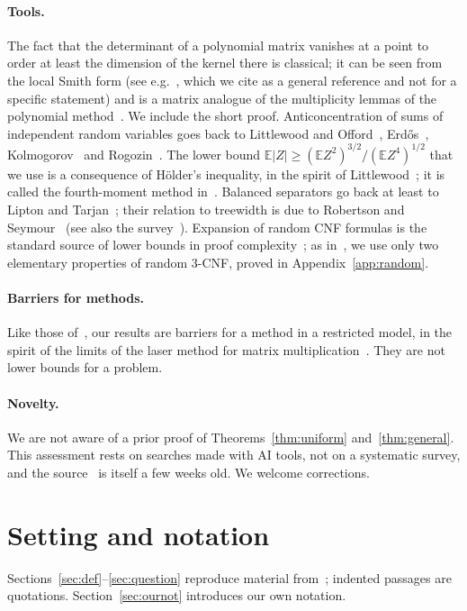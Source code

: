 \documentclass[11pt,a4paper]{article}
\theoremstyle{definition}
\theoremstyle{remark}
\newcommand{\E}{\mathbb{E}}
\begin{document}
\paragraph{Tools.} The fact that the determinant of a polynomial matrix vanishes at a point
to order at least the dimension of the kernel there is classical; it can be seen from the
local Smith form (see e.g.~\cite{GLR82}, which we cite as a general reference and not for a
specific statement) and is a matrix analogue of the multiplicity lemmas of the polynomial
method~\cite{DKSS13}. We include the short proof. Anticoncentration of sums of independent
random variables goes back to Littlewood and Offord~\cite{LO43}, Erd\H{o}s~\cite{Erd45},
Kolmogorov~\cite{Kol58} and Rogozin~\cite{Rog61}. The lower bound
$\E|Z|\ge(\E Z^2)^{3/2}/(\E Z^4)^{1/2}$ that we use is a consequence of H\"older's
inequality, in the spirit of Littlewood~\cite{Lit30}; it is called the fourth-moment method
in~\cite{Ber97}. Balanced separators go back at least to Lipton and Tarjan~\cite{LT79};
their relation to treewidth is due to Robertson and Seymour~\cite{RS86} (see also the
survey~\cite{Bod93}). Expansion of random CNF formulas is the standard
source of lower bounds in proof complexity~\cite{CS88,BSW01,BSI10}; as in~\cite{DL}, we use
only two elementary properties of random 3-CNF, proved in Appendix~\ref{app:random}.

\paragraph{Barriers for methods.} Like those of~\cite{DL}, our results are barriers for a
method in a restricted model, in the spirit of the limits of the laser method for matrix
multiplication~\cite{AFL15,AVW18}. They are not lower bounds for a problem.

\paragraph{Novelty.} We are not aware of a prior proof of
Theorems~\ref{thm:uniform} and~\ref{thm:general}. This assessment rests on searches made
with AI tools, not on a systematic survey, and the source~\cite{DL} is itself a few weeks
old. We welcome corrections.

\section{Setting and notation}\label{sec:setting}

Sections~\ref{sec:def}--\ref{sec:question} reproduce material from~\cite{DL}; indented
passages are quotations. Section~\ref{sec:ournot} introduces our own notation.
\end{document}
